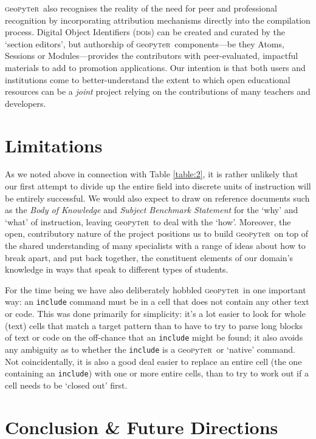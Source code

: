 \documentclass[letter, 11pt,titlepage]{article}
\newcommand{\gp}{\textsc{g}eo\textsc{p}y\textsc{t}e\textsc{r}~\/}
\begin{document}
\gp also recognises the reality of the need for peer and professional recognition by incorporating attribution mechanisms directly into the compilation process. Digital Object Identifiers (\textsc{doi}s) can be created and curated by the `section editors', but authorship of \gp components---be they Atoms, Sessions or Modules---provides the contributors with peer-evaluated, impactful materials to add to promotion applications. Our intention is that both users and institutions come to better-understand the extent to which open educational resources can be a \emph{joint} project relying on the contributions of many teachers and developers.

\section{Limitations}\label{limitations}

As we noted above in connection with Table \ref{table:2}, it is rather unlikely that our first attempt to divide up the entire field into discrete units of instruction will be entirely successful. We would also expect to draw on reference documents such as the \emph{Body of Knowledge} \citep{bok2018} and \emph{Subject Benchmark Statement} \citep{QAA2014} for the `why' and `what' of instruction, leaving \gp to deal with the `how'. Moreover, the open, contributory nature of the project positions us to build \gp on top of the shared understanding of many specialists with a range of ideas about how to break apart, and put back together, the constituent elements of our domain's  knowledge in ways that speak to different types of students.

For the time being we have also deliberately hobbled \gp in one important way: an \texttt{include} command must be in a cell that does not contain any other text or code. This was done primarily for simplicity: it's a lot easier to look for whole (text) cells that match a target pattern than to have to try to parse long blocks of text or code on the off-chance that an \texttt{include} might be found; it also avoids any ambiguity as to whether the \texttt{include} is a \gp or `native' command. Not coincidentally, it is also a good deal easier to replace an entire cell (the one containing an \texttt{include}) with one or more entire cells, than to try to work out if a cell needs to be `closed out' first.

\section{Conclusion \& Future Directions}\label{future}
\end{document}
